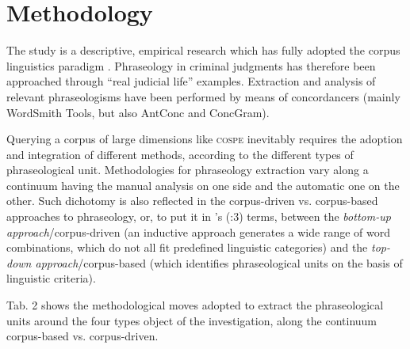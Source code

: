 \documentclass[output=paper]{LSP/langsci}
\begin{document}
\section{Methodology}
The study is a descriptive, empirical research which has fully adopted the corpus linguistics paradigm \citep[see][]{McEnery2006}. Phraseology in criminal judgments has therefore been approached through “real judicial life” examples. Extraction and analysis of relevant phraseologisms have been performed by means of concordancers (mainly WordSmith Tools, but also AntConc and ConcGram).

Querying a corpus of large dimensions like \textsc{cospe} inevitably requires the adoption and integration of different methods, according to the different types of phraseological unit. Methodologies for phraseology extraction vary along a continuum having the manual analysis on one side and the automatic one on the other. Such dichotomy is also reflected in the corpus-driven vs. corpus-based approaches to phraseology, or, to put it in \citeauthor{Granger2005}'s (\citeyear{Granger2005}:3) terms, between the \textit{bottom-up approach}/corpus-driven (an inductive approach generates a wide range of word combinations, which do not all fit predefined linguistic categories) and the \textit{top-down approach}/corpus-based (which identifies phraseological units on the basis of linguistic criteria).

Tab. 2 shows the methodological moves adopted to extract the phraseological units around the four types object of the investigation, along the continuum corpus-based vs. corpus-driven.
\end{document}
